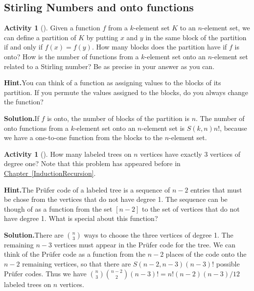 \documentclass[10pt,]{book}
\theoremstyle{plain}
\theoremstyle{definition}
\newtheorem{activity}[project]{Activity}
\numberwithin{equation}{chapter}
\begin{document}
\subsection[{Stirling Numbers and onto functions}]{Stirling Numbers and onto functions}\label{subsection-34}
\begin{activity}[]\label{activity-133}
Given a function \(f\) from a \(k\)-element set \(K\) to an \(n\)-element set, we can define a partition of \(K\) by putting \(x\) and \(y\) in the same block of the partition if and only if \(f(x)=f(y)\). How many blocks does the partition have if \(f\) is onto? How is the number of functions from a \(k\)-element set onto an \(n\)-element set related to a Stirling number? Be as precise in your answer as you can.%
\par\medskip\noindent%
\textbf{Hint.}\quad You can think of a function as assigning values to the blocks of its partition. If you permute the values assigned to the blocks, do you always change the function?%
\par\medskip\noindent%
\textbf{Solution.}\quad If \(f\) is onto, the number of blocks of the partition is \(n\). The number of onto functions from a \(k\)-element set onto an \(n\)-element set is \(S(k,n)n!\), because we have a one-to-one function from the blocks to the \(n\)-element set.%
\end{activity}
\begin{activity}[]\label{activity-134}
How many labeled trees on \(n\) vertices have exactly 3 vertices of degree one?  Note that this problem has appeared before in \hyperref[InductionRecursion]{Chapter~\ref{InductionRecursion}}.%
\par\medskip\noindent%
\textbf{Hint.}\quad The Prüfer code of a labeled tree is a sequence of \(n-2\) entries that must be chose from the vertices that do not have degree 1. The sequence can be though of as a function from the set \([n-2]\) to the set of vertices that do not have degree 1. What is special about this function?%
\par\medskip\noindent%
\textbf{Solution.}\quad There are \(\binom{n}{3}\) ways to choose the three vertices of degree 1.  The remaining \(n-3\) vertices must appear in the Prüfer code for the tree.  We can think of the Prüfer code as a function from the \(n-2\) places of the code onto the \(n-2\) remaining vertices, so that there are \(S(n-2, n-3)(n-3)!\) possible Prüfer codes.  Thus we have \(\binom{n}{3}\binom{n-2}{2}(n-3)! = n!(n-2)(n-3)/12\) labeled trees on \(n\) vertices.%
\end{activity}
\end{document}
